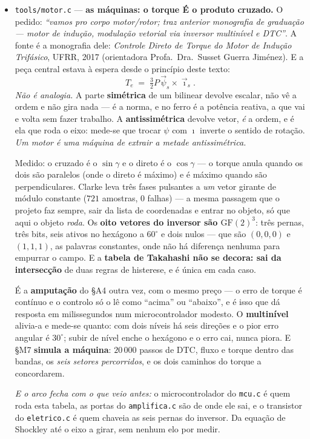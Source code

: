 \documentclass[11pt]{article}
\newcommand{\code}[1]{\texttt{\small #1}}
\theoremstyle{plain}
\theoremstyle{remark}
\begin{document}
\begin{itemize}
\item \code{tools/motor.c} --- \textbf{as máquinas: o torque É o produto cruzado.} O pedido: \emph{``vamos pro corpo motor/rotor; traz anterior monografia de graduação --- motor de indução,
modulação vetorial via inversor multinível e DTC''}. A fonte é a monografia dele: \emph{Controle
Direto de Torque do Motor de Indução Trifásico}, UFRR, 2017 (orientadora Profa.\ Dra.\ Susset
Guerra Jiménez). E a peça central estava à espera desde o princípio deste texto:
\[
 T_e \;=\; \tfrac32 P\,\vec\psi_s\times\vec\imath_s.
\]
\emph{Não é analogia.} A parte \textbf{simétrica} de um bilinear devolve escalar, não vê a ordem e
não gira nada --- é a norma, e no ferro é a potência reativa, a que vai e volta sem fazer trabalho.
A \textbf{antissimétrica} devolve vetor, \emph{é} a ordem, e é ela que roda o eixo: mede-se que
trocar $\psi$ com $\imath$ inverte o sentido de rotação. \emph{Um motor é uma máquina de extrair a
metade antissimétrica.}

Medido: o cruzado é o $\sin\gamma$ e o direto é o $\cos\gamma$ --- o torque anula quando os dois são
paralelos (onde o direto é máximo) e é máximo quando são perpendiculares. Clarke leva três fases
pulsantes a \emph{um} vetor girante de módulo constante ($721$ amostras, $0$ falhas) --- a mesma
passagem que o projeto faz sempre, sair da lista de coordenadas e entrar no objeto, só que aqui o
objeto \emph{roda}. Os \textbf{oito vetores do inversor são $\mathrm{GF}(2)^3$}: três pernas, três
bits, seis ativos no hexágono a $60^\circ$ e dois nulos --- que são $(0,0,0)$ e $(1,1,1)$, as
palavras constantes, onde não há diferença nenhuma para empurrar o campo. E a \textbf{tabela de
Takahashi não se decora: sai da intersecção} de duas regras de histerese, e é única em cada caso.

É a \textbf{amputação} do §A4 outra vez, com o mesmo preço --- o erro de torque é contínuo e o
controlo só o lê como ``acima'' ou ``abaixo'', e é isso que dá resposta em milissegundos num
microcontrolador modesto. O \textbf{multinível} alivia-a e mede-se quanto: com dois níveis há seis
direções e o pior erro angular é $30^\circ$; subir de nível enche o hexágono e o erro cai, nunca
piora. E §M7 \textbf{simula a máquina}: $20\,000$ passos de DTC, fluxo e torque dentro das bandas,
os \emph{seis setores percorridos}, e os dois caminhos do torque a concordarem.

\emph{E o arco fecha com o que veio antes:} o microcontrolador do \code{mcu.c} é quem roda esta
tabela, as portas do \code{amplifica.c} são de onde ele sai, e o transistor do \code{eletrico.c} é
quem chaveia as seis pernas do inversor. Da equação de Shockley até o eixo a girar, sem nenhum elo
por medir.


\end{itemize}
\end{document}

